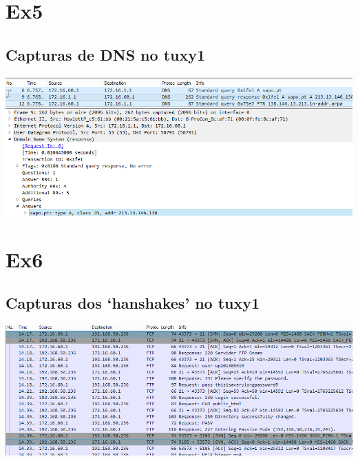 \documentclass[11pt,a4paper,reqno]{report}
\numberwithin{equation}{section}
\begin{document}
\begin{appendices}
\section{Ex5}%

\subsection{Capturas de DNS no tuxy1}
\label{ex5_dns}
\includegraphics[width=18cm]{ex5_dns.png}

\section{Ex6}%

\subsection{Capturas dos `hanshakes' no tuxy1}
\label{ex6_tux1_handshakes}
\includegraphics[width=18cm]{ex6_tux1_handshakes.png}


\end{appendices}
\end{document}
